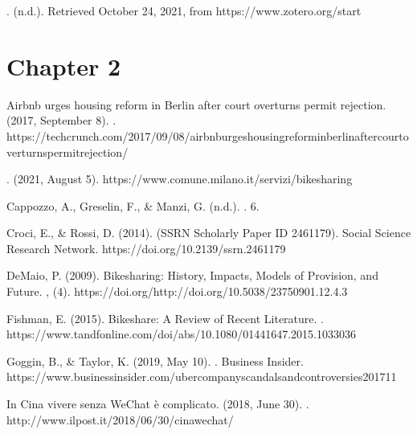 \documentclass[letterpaper,10pt,english]{jupyterBook}
\begin{document}
\sphinxAtStartPar
{}. (n.d.). Retrieved October 24, 2021, from https://www.zotero.org/start


\section{Chapter 2}
\label{\detokenize{references:chapter-2}}
\sphinxAtStartPar
Airbnb urges housing reform in Berlin after court overturns permit rejection. (2017, September 8). . https://techcrunch.com/2017/09/08/airbnb\sphinxhyphen{}urges\sphinxhyphen{}housing\sphinxhyphen{}reform\sphinxhyphen{}in\sphinxhyphen{}berlin\sphinxhyphen{}after\sphinxhyphen{}court\sphinxhyphen{}overturns\sphinxhyphen{}permit\sphinxhyphen{}rejection/

\sphinxAtStartPar
{}. (2021, August 5). https://www.comune.milano.it/servizi/bike\sphinxhyphen{}sharing

\sphinxAtStartPar
Cappozzo, A., Greselin, F., \& Manzi, G. (n.d.). . 6.

\sphinxAtStartPar
Croci, E., \& Rossi, D. (2014).  (SSRN Scholarly Paper ID 2461179). Social Science Research Network. https://doi.org/10.2139/ssrn.2461179

\sphinxAtStartPar
DeMaio, P. (2009). Bike\sphinxhyphen{}sharing: History, Impacts, Models of Provision, and Future. , (4). https://doi.org/http://doi.org/10.5038/2375\sphinxhyphen{}0901.12.4.3

\sphinxAtStartPar
Fishman, E. (2015). Bikeshare: A Review of Recent Literature. . https://www.tandfonline.com/doi/abs/10.1080/01441647.2015.1033036

\sphinxAtStartPar
Goggin, B., \& Taylor, K. (2019, May 10). . Business Insider. https://www.businessinsider.com/uber\sphinxhyphen{}company\sphinxhyphen{}scandals\sphinxhyphen{}and\sphinxhyphen{}controversies\sphinxhyphen{}2017\sphinxhyphen{}11

\sphinxAtStartPar
In Cina vivere senza WeChat è complicato. (2018, June 30). . http://www.ilpost.it/2018/06/30/cina\sphinxhyphen{}wechat/
\end{document}

